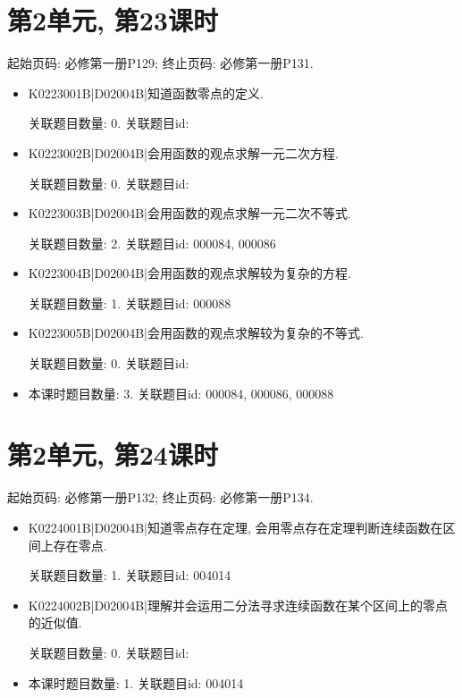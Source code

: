 \section*{第2单元, 第23课时}
起始页码: 必修第一册P129; 终止页码: 必修第一册P131.
\begin{itemize}
\item K0223001B|D02004B|知道函数零点的定义.

关联题目数量: 0. 关联题目id: 

\item K0223002B|D02004B|会用函数的观点求解一元二次方程.

关联题目数量: 0. 关联题目id: 

\item K0223003B|D02004B|会用函数的观点求解一元二次不等式.

关联题目数量: 2. 关联题目id: 000084, 000086

\item K0223004B|D02004B|会用函数的观点求解较为复杂的方程.

关联题目数量: 1. 关联题目id: 000088

\item K0223005B|D02004B|会用函数的观点求解较为复杂的不等式.

关联题目数量: 0. 关联题目id: 

\item 本课时题目数量: 3. 关联题目id: 000084, 000086, 000088

\end{itemize}

\section*{第2单元, 第24课时}
起始页码: 必修第一册P132; 终止页码: 必修第一册P134.
\begin{itemize}
\item K0224001B|D02004B|知道零点存在定理, 会用零点存在定理判断连续函数在区间上存在零点.

关联题目数量: 1. 关联题目id: 004014

\item K0224002B|D02004B|理解并会运用二分法寻求连续函数在某个区间上的零点的近似值.

关联题目数量: 0. 关联题目id: 

\item 本课时题目数量: 1. 关联题目id: 004014

\end{itemize}

